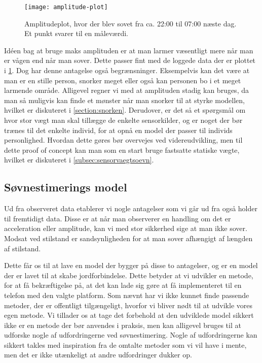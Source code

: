 \begin{figure}[h]
	\centering
	\texttt{[image: amplitude-plot]}
	\caption{Amplitudeplot, hvor der blev sovet fra ca. 22:00 til 07:00 næste dag. Et punkt svarer til en måleværdi.}\label{fig:amplplot}
\end{figure}

Idéen bag at bruge maks amplituden er at man larmer væsentligt mere når man er vågen end når man sover.
Dette passer fint med de loggede data der er plottet i \cref{fig:amplplot}.
Dog har denne antagelse også begrænsninger.
Eksempelvis kan det være at man er en stille person, snorker meget eller også kan personen bo i et meget larmende område.
Alligevel regner vi med at amplituden stadig kan bruges, da man så muligvis kan finde et mønster når man snorker til at styrke modellen, hvilket er diskuteret i \cref{section:snorken}.
Derudover, er det så et spørgsmål om hvor stor vægt man skal tillægge de enkelte sensorkilder, og er noget der bør trænes til det enkelte individ, for at opnå en model der passer til individs personlighed.
Hvordan dette gøres bør overvejes ved videreudvikling, men til dette proof of concept kan man som en start bruge fastsatte statiske vægte, hvilket er diskuteret i \cref{subsec:sensorvaegtsoevn}.

\subsection{Søvnestimerings model}
Ud fra observeret data etablerer vi nogle antagelser som vi går ud fra også holder til fremtidigt data.
Disse er at når man observerer en handling om det er acceleration eller amplitude, kan vi med stor sikkerhed sige at man ikke sover.
Modsat ved stilstand er sandsynligheden for at man sover afhængigt af længden af stilstand.

Dette får os til at lave en model der bygger på disse to antagelser, og er en model der er lavet til at skabe jordforbindelse.
Dette betyder at vi udvikler en metode, for at få bekræftigelse på, at det kan lade sig gøre at få implementeret til en telefon med den valgte platform.
Som nævnt har vi ikke kunnet finde passende metoder, der er offentligt tilgængeligt, hvorfor vi bliver nødt til at udvikle vores egen metode.
Vi tillader os at tage det forbehold at den udviklede model sikkert ikke er en metode der bør anvendes i praksis, men kan alligevel bruges til at udforske nogle af udfordringerne ved søvnestimering.
Nogle af udfordringerne kan sikkert takles med inspiration fra de omtalte metoder som vi vil have i mente, men det er ikke utænkeligt at andre udfordringer dukker op.

